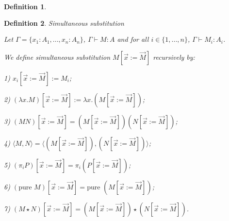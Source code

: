 \documentclass[a4paper]{article}
\newtheorem{defin}{Definition}
\begin{document}
\begin{defin}
\begin{prooftree}
\end{prooftree}

\begin{prooftree}
\end{prooftree}

\begin{prooftree}
\end{prooftree}

\end{defin}

\begin{defin} Simultaneous substitution

Let $\Gamma = \{ x_1 : A_1, ..., x_n : A_n \}$, $\Gamma \vdash M : A$ and for all $i \in \{ 1,..., n \}$,
$\Gamma \vdash M_i : A_i$.

We define simultaneous substitution $M [ \vec{x} := \vec{M}]$ recursively by:

1) $x_i [ \vec{x} := \vec{M}] := M_i $;

2) $(\lambda x. M) [ \vec{x} := \vec{M}] := \lambda x. (M [ \vec{x} := \vec{M}])$;

3) $(M N) [ \vec{x} := \vec{M}] = (M [ \vec{x} := \vec{M}]) (N [ \vec{x} := \vec{M}])$;

4) $\langle M, N \rangle = \langle (M [ \vec{x} := \vec{M}]), (N [ \vec{x} := \vec{M}])\rangle$;

5) $(\pi_i P) [ \vec{x} := \vec{M}] = \pi_i (P [ \vec{x} := \vec{M}])$;

6) $(\text{pure } M) [ \vec{x} := \vec{M}] = \text{pure } (M [ \vec{x} := \vec{M}])$;

7) $(M \star N) [ \vec{x} := \vec{M}] = (M [ \vec{x} := \vec{M}])
\star (N [ \vec{x} := \vec{M}])$.

\end{defin}
\end{document}
